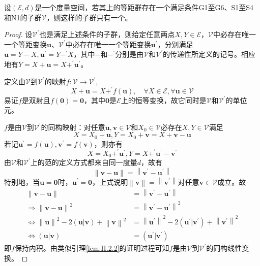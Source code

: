 \documentclass[main.tex]{subfiles}
\begin{document}
\begin{lemma}\label{lem:A.4}
    设$\left(\mathcal{E},d\right)$是一个度量空间，若其上的等距群存在一个满足条件G1至G6、S1至S4和N1的子群$\mathcal{V}$，则这样的子群只有一个。
\end{lemma}
\begin{proof}
    设$\mathcal{V}^\prime$也是满足上述条件的子群，则给定任意两点$X,Y\in\mathcal{E}$，$\mathcal{V}$中必存在唯一一个等距变换$\mathbf{u}$、$\mathcal{V}^\prime$中必存在唯一一个等距变换$\mathbf{u}^\prime$，分别满足$\mathbf{u}=Y-X,\mathbf{u}^\prime=Y-^\prime X$，其中$-$和$-^\prime$分别是由$\mathcal{V}$和$\mathcal{V}^\prime$的传递性所定义的记号。相应地有$Y=X+\mathbf{u}=X+^\prime\mathbf{u}^\prime$。

    定义由$\mathcal{V}$到$\mathcal{V}^\prime$的映射$f:\mathcal{V}\rightarrow\mathcal{V}^\prime,$
    \[X+\mathbf{u}=X+^\prime f\left(\mathbf{u}\right), \quad\forall X\in\mathcal{E},\forall\mathbf{u}\in\mathcal{V}\]
    易证$f$是双射且$f\left(\mathbf{0}\right)=\mathbf{0}$，其中$\mathbf{0}$是$\mathcal{E}$上的恒等变换，故它同时是$\mathcal{V}$和$\mathcal{V}^\prime$的单位元。

    $f$是由$\mathcal{V}$到$\mathcal{V}^\prime$的同构映射：对任意$\mathbf{u},\mathbf{v}\in\mathcal{V}$和$X_0\in\mathcal{V}$必存在$X,Y\in\mathcal{V}$满足
    \[X=X_0+\mathbf{u},Y=X_0+\mathbf{v}=X+\mathbf{v}-\mathbf{u}\]
    若记$\mathbf{u}^\prime=f\left(\mathbf{u}\right),\mathbf{v}^\prime=f\left(\mathbf{v}\right)$，则亦有
    \[X=X_0+^\prime\mathbf{u}^\prime,Y=X+^\prime\mathbf{u}^\prime-\mathbf{v}^\prime\]
    由$\mathcal{V}$和$\mathcal{V}^\prime$上的范的定义方式都来自同一度量$d$，故有
    \[\left\|\mathbf{v}-\mathbf{u}\right\|=\left\|\mathbf{v}^\prime-\mathbf{u}^\prime\right\|\]
    特别地，当$\mathbf{u}=\mathbf{0}$时，$\mathbf{u}^\prime=\mathbf{0}$，上式说明$\left\|\mathbf{v}\right\|=\left\|\mathbf{v}^\prime\right\|$对任意$\mathbf{v}\in\mathcal{V}$成立。故
    \begin{align*}
        \left\|\mathbf{v}-\mathbf{u}\right\|                                                                       & =\left\|\mathbf{v}^\prime-\mathbf{u}^\prime\right\|                                                                      \\
        \Rightarrow\left\|\mathbf{v}-\mathbf{u}\right\|^2                                                          & =\left\|\mathbf{v}^\prime-\mathbf{u}^\prime\right\|^2                                                                    \\
        \Leftrightarrow\left\|\mathbf{u}\right\|^2-2\left(\mathbf{u}|\mathbf{v}\right)+\left\|\mathbf{v}\right\|^2 & =\left\|\mathbf{u}^\prime\right\|^2-2\left(\mathbf{u}^\prime|\mathbf{v}^\prime\right)+\left\|\mathbf{v}^\prime\right\|^2 \\
        \Leftrightarrow\left(\mathbf{u}|\mathbf{v}\right)                                                          & =\left(\mathbf{u}^\prime|\mathbf{v}^\prime\right)
    \end{align*}
    即$f$保持内积。由类似引理\ref{lem:II.2.2}的证明过程可知$f$是由$\mathcal{V}$到$\mathcal{V}^\prime$的同构线性变换。


\end{proof}
\end{document}
